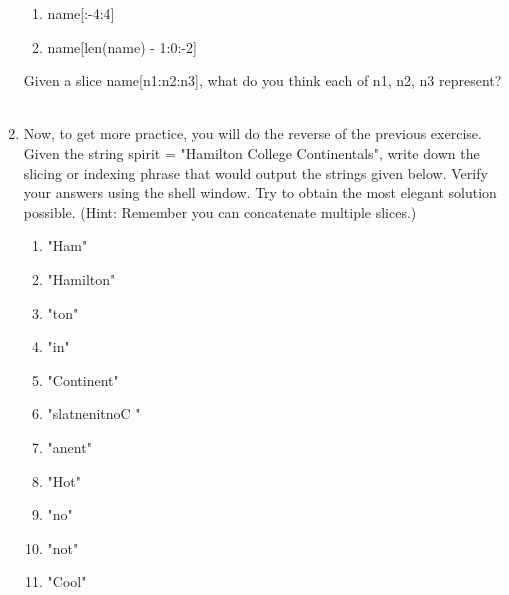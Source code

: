 \documentclass[11pt, letterpaper, onecolumn, oneside, final]{article}
\begin{document}
\begin{enumerate}
\begin{enumerate}
\item {\consolas name[:-4:4]}\\
\item  {\consolas name[len(name) - 1:0:-2]}\\
\end{enumerate}
Given a slice {\consolas name[n1:n2:n3]}, what do you think each of {\consolas n1}, {\consolas n2}, {\consolas n3} represent?\\
\\
\item Now, to get more practice, you will do the reverse of the previous exercise. Given the string {\consolas spirit = "Hamilton College Continentals"}, write down the slicing or indexing phrase that would output the strings given below. Verify your answers using the shell window. Try to obtain the most elegant solution possible. (Hint: Remember you can concatenate multiple slices.)
\begin{enumerate}
    \item "Ham"\\
    \item "Hamilton"\\
    \item "ton"\\
    \item "in"\\
    \item "Continent"\\
    \item "slatnenitnoC "\\
    \item "anent" \\ 
    \item "Hot"\\
    \item "no"\\
    \item "not"\\
    \item "Cool"\\
\end{enumerate}


\end{enumerate}
\end{document}
